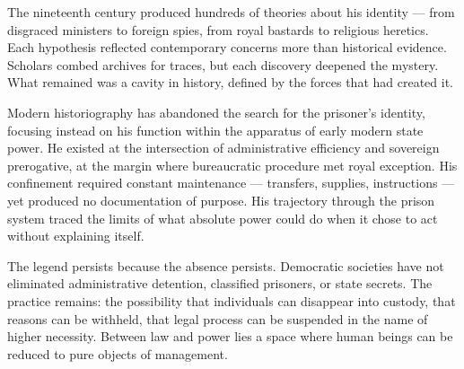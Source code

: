 The nineteenth century produced hundreds of theories about his identity — from disgraced ministers to foreign spies, from royal bastards to religious heretics. Each hypothesis reflected contemporary concerns more than historical evidence. Scholars combed archives for traces, but each discovery deepened the mystery. What remained was a cavity in history, defined by the forces that had created it.

Modern historiography has abandoned the search for the prisoner's identity, focusing instead on his function within the apparatus of early modern state power. He existed at the intersection of administrative efficiency and sovereign prerogative, at the margin where bureaucratic procedure met royal exception. His confinement required constant maintenance — transfers, supplies, instructions — yet produced no documentation of purpose. His trajectory through the prison system traced the limits of what absolute power could do when it chose to act without explaining itself.

The legend persists because the absence persists. Democratic societies have not eliminated administrative detention, classified prisoners, or state secrets. The practice remains: the possibility that individuals can disappear into custody, that reasons can be withheld, that legal process can be suspended in the name of higher necessity. Between law and power lies a space where human beings can be reduced to pure objects of management.

